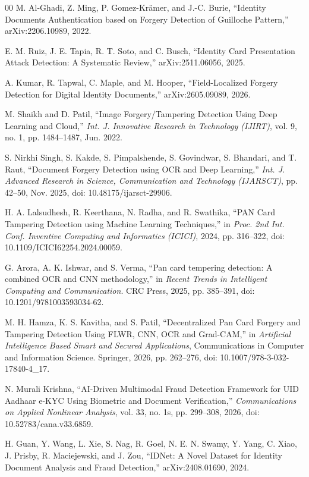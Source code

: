 \documentclass[conference]{IEEEtran}
\begin{document}
\begin{thebibliography}{00}
 M. Al-Ghadi, Z. Ming, P. Gomez-Krämer, and
J.-C. Burie, ``Identity Documents Authentication based on Forgery
Detection of Guilloche Pattern,'' arXiv:2206.10989, 2022.

 E. M. Ruiz, J. E. Tapia, R. T. Soto, and C. Busch,
``Identity Card Presentation Attack Detection: A Systematic Review,''
arXiv:2511.06056, 2025.

 A. Kumar, R. Tapwal, C. Maple, and M. Hooper,
``Field-Localized Forgery Detection for Digital Identity Documents,''
arXiv:2605.09089, 2026.

 M. Shaikh and D. Patil, ``Image Forgery/Tampering
Detection Using Deep Learning and Cloud,'' \emph{Int. J. Innovative
Research in Technology (IJIRT)}, vol. 9, no. 1, pp. 1484--1487,
Jun. 2022.

 S. Nirkhi Singh, S. Kakde, S. Pimpalshende,
S. Govindwar, S. Bhandari, and T. Raut, ``Document Forgery Detection
using OCR and Deep Learning,'' \emph{Int. J. Advanced Research in
Science, Communication and Technology (IJARSCT)}, pp. 42--50, Nov. 2025,
doi: 10.48175/ijarsct-29906.

 H. A. Lalsudhesh, R. Keerthana, N. Radha, and
R. Swathika, ``PAN Card Tampering Detection using Machine Learning
Techniques,'' in \emph{Proc. 2nd Int. Conf. Inventive Computing and
Informatics (ICICI)}, 2024, pp. 316--322,
doi: 10.1109/ICICI62254.2024.00059.

 G. Arora, A. K. Ishwar, and S. Verma, ``Pan card
tempering detection: A combined OCR and CNN methodology,'' in
\emph{Recent Trends in Intelligent Computing and Communication}. CRC
Press, 2025, pp. 385--391, doi: 10.1201/9781003593034-62.

 M. H. Hamza, K. S. Kavitha, and S. Patil,
``Decentralized Pan Card Forgery and Tampering Detection Using FLWR,
CNN, OCR and Grad-CAM,'' in \emph{Artificial Intelligence Based Smart
and Secured Applications}, Communications in Computer and Information
Science. Springer, 2026, pp. 262--276,
doi: 10.1007/978-3-032-17840-4\_17.

 N. Murali Krishna, ``AI-Driven Multimodal Fraud
Detection Framework for UID Aadhaar e-KYC Using Biometric and Document
Verification,'' \emph{Communications on Applied Nonlinear Analysis},
vol. 33, no. 1s, pp. 299--308, 2026, doi: 10.52783/cana.v33.6859.

 H. Guan, Y. Wang, L. Xie, S. Nag, R. Goel,
N. E. N. Swamy, Y. Yang, C. Xiao, J. Prisby, R. Maciejewski, and
J. Zou, ``IDNet: A Novel Dataset for Identity Document Analysis and
Fraud Detection,'' arXiv:2408.01690, 2024.


\end{thebibliography}
\end{document}
